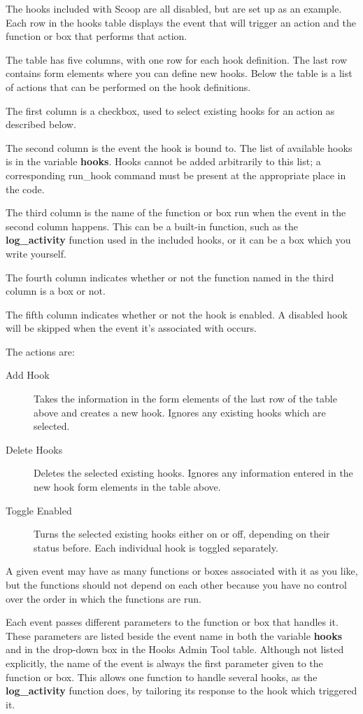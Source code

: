 The hooks included with Scoop are all disabled, but are set up as an example. Each row in the hooks table displays the event that will trigger an action and the function or box that performs that action.

The table has five columns, with one row for each hook definition. The last row contains form elements where you can define new hooks. Below the table is a list of actions that can be performed on the hook definitions.

The first column is a checkbox, used to select existing hooks for an action as described below.

The second column is the event the hook is bound to. The list of available hooks is in the variable {\bf hooks}. Hooks cannot be added arbitrarily to this list; a corresponding run\_hook command must be present at the appropriate place in the code.

The third column is the name of the function or box run when the event in the second column happens.  This can be a built-in function, such as the {\bf log\_activity} function used in the included hooks, or it can be a box which you write yourself.

The fourth column indicates whether or not the function named in the third column is a box or not.

The fifth column indicates whether or not the hook is enabled. A disabled hook will be skipped when the event it's associated with occurs.

The actions are:

\begin{description}
\item[Add Hook] Takes the information in the form elements of the last row of the table above and creates a new hook. Ignores any existing hooks which are selected.
\item[Delete Hooks] Deletes the selected existing hooks. Ignores any information entered in the new hook form elements in the table above.
\item[Toggle Enabled] Turns the selected existing hooks either on or off, depending on their status before. Each individual hook is toggled separately.
\end{description}

A given event may have as many functions or boxes associated with it as you like, but the functions should not depend on each other because you have no control over the order in which the functions are run.

Each event passes different parameters to the function or box that handles it. These parameters are listed beside the event name in both the variable {\bf hooks} and in the drop-down box in the Hooks Admin Tool table. Although not listed explicitly, the name of the event is always the first parameter given to the function or box. This allows one function to handle several hooks, as the {\bf log\_activity} function does, by tailoring its response to the hook which triggered it.

